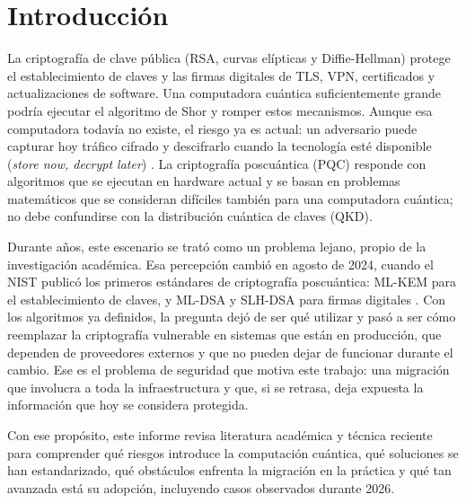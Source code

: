 \section{Introducción}
\label{sec:introduccion}

La criptografía de clave pública (RSA, curvas elípticas y Diffie-Hellman) protege el establecimiento de claves y las firmas digitales de TLS, VPN, certificados y actualizaciones de software. Una computadora cuántica suficientemente grande podría ejecutar el algoritmo de Shor y romper estos mecanismos. Aunque esa computadora todavía no existe, el riesgo ya es actual: un adversario puede capturar hoy tráfico cifrado y descifrarlo cuando la tecnología esté disponible (\textit{store now, decrypt later}) \cite{joseph2022transitioning}. La criptografía poscuántica (PQC) responde con algoritmos que se ejecutan en hardware actual y se basan en problemas matemáticos que se consideran difíciles también para una computadora cuántica; no debe confundirse con la distribución cuántica de claves (QKD).

Durante años, este escenario se trató como un problema lejano, propio de la investigación académica. Esa percepción cambió en agosto de 2024, cuando el NIST publicó los primeros estándares de criptografía poscuántica: ML-KEM para el establecimiento de claves, y ML-DSA y SLH-DSA para firmas digitales \cite{nist2024fips203,nist2024fips204,nist2024fips205}. Con los algoritmos ya definidos, la pregunta dejó de ser qué utilizar y pasó a ser cómo reemplazar la criptografía vulnerable en sistemas que están en producción, que dependen de proveedores externos y que no pueden dejar de funcionar durante el cambio. Ese es el problema de seguridad que motiva este trabajo: una migración que involucra a toda la infraestructura y que, si se retrasa, deja expuesta la información que hoy se considera protegida.

Con ese propósito, este informe revisa literatura académica y técnica reciente para comprender qué riesgos introduce la computación cuántica, qué soluciones se han estandarizado, qué obstáculos enfrenta la migración en la práctica y qué tan avanzada está su adopción, incluyendo casos observados durante 2026.
